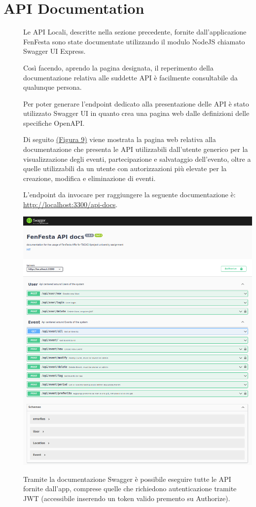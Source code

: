 \documentclass{article}
\begin{document}
\section{API Documentation}
\begin{description}
    \item[] Le API Locali, descritte nella sezione precedente, fornite dall'applicazione FenFesta sono state documentate utilizzando il modulo NodeJS chiamato Swagger UI Express.
    \item[] Così facendo, aprendo la pagina designata, il reperimento della documentazione relativa alle suddette API è facilmente consultabile da qualunque persona.
    \item[] Per poter generare l'endpoint dedicato alla presentazione delle API è stato utilizzato Swagger UI in quanto crea una pagina web dalle definizioni delle specifiche OpenAPI.
    \item[] Di seguito \hyperref[img:9]{(Figura 9)} viene mostrata la pagina web relativa alla documentazione che presenta le API utilizzabili dall'utente generico per la visualizzazione degli eventi, partecipazione e salvataggio dell'evento, oltre a quelle utilizzabili da un utente con autorizzazioni più elevate per la creazione, modifica e eliminazione di eventi.
    \item[] L'endpoint da invocare per raggiungere la seguente documentazione è: \url{http://localhost:3300/api-docs}.
    \item[] \label{img:9} \begin{center}
            \includegraphics[scale=0.5]{documentazione.png}
        \end{center}
    \item[] Tramite la documentazione Swagger è possibile eseguire tutte le API fornite dall'app, comprese quelle che richiedono autenticazione tramite JWT (accessibile inserendo un token valido premento su Authorize).
\end{description}
\clearpage
\end{document}
